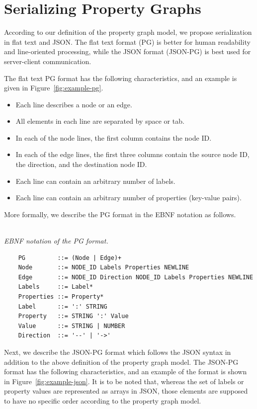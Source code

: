 \documentclass[runningheads]{llncs}
\begin{document}
\section{Serializing Property Graphs}
According to our definition of the property graph model, we propose serialization in flat text and JSON. The flat text format (PG) is better for human readability and line-oriented processing, while the JSON format (JSON-PG) is best used for server-client communication.

The flat text PG format has the following characteristics, and an example is given in Figure~\ref{fig:example-pg}.

\begin{itemize}
    \item Each line describes a node or an edge.
    \item All elements in each line are separated by space or tab.
    \item In each of the node lines, the first column contains the node ID.
    \item In each of the edge lines, the first three columns contain the source node ID, the direction, and the destination node ID.
    \item Each line can contain an arbitrary number of labels.
    \item Each line can contain an arbitrary number of properties (key-value pairs).
\end{itemize}

More formally, we describe the PG format in the EBNF notation as follows.

\begin{defi}[PG Format]
\leavevmode \vspace{1mm} \\
\emph{EBNF notation of the PG format.}
\begin{scriptsize}
\begin{verbatim}
    PG         ::= (Node | Edge)+
    Node       ::= NODE_ID Labels Properties NEWLINE
    Edge       ::= NODE_ID Direction NODE_ID Labels Properties NEWLINE
    Labels     ::= Label*
    Properties ::= Property*
    Label      ::= ':' STRING
    Property   ::= STRING ':' Value
    Value      ::= STRING | NUMBER
    Direction  ::= '--' | '->'
\end{verbatim}
\end{scriptsize}
\end{defi}

Next, we describe the JSON-PG format which follows the JSON syntax in addition to the above definition of the property graph model. The JSON-PG format has the following characteristics, and an example of the format is shown in Figure~\ref{fig:example-json}. It is to be noted that, whereas the set of labels or property values are represented as arrays in JSON, those elements are supposed to have no specific order according to the property graph model.
\end{document}
